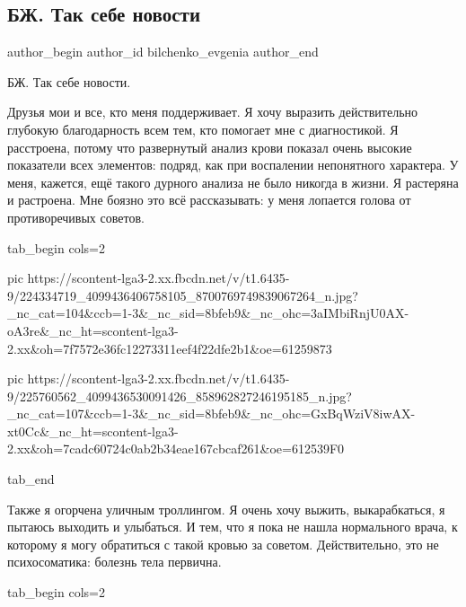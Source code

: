  
 
 
 
 
 
\subsection{БЖ. Так себе новости}
\label{sec:27_07_2021.fb.bilchenko_evgenia.5.bolezn}
\ifcmt
 author_begin
   author_id bilchenko_evgenia
 author_end
\fi

БЖ. Так себе новости.

Друзья мои и все, кто меня поддерживает. Я хочу выразить действительно глубокую
благодарность всем тем, кто помогает мне с диагностикой. Я расстроена, потому
что развернутый анализ крови показал очень высокие показатели всех элементов:
подряд, как при воспалении непонятного характера. У меня, кажется, ещё такого
дурного анализа не было никогда в жизни. Я растеряна и растроена. Мне боязно
это всё рассказывать: у меня лопается голова от противоречивых советов.

\ifcmt
  tab_begin cols=2

     pic https://scontent-lga3-2.xx.fbcdn.net/v/t1.6435-9/224334719_4099436406758105_8700769749839067264_n.jpg?_nc_cat=104&ccb=1-3&_nc_sid=8bfeb9&_nc_ohc=3aIMbiRnjU0AX-oA3re&_nc_ht=scontent-lga3-2.xx&oh=7f7572e36fc12273311eef4f22dfe2b1&oe=61259873

     pic https://scontent-lga3-2.xx.fbcdn.net/v/t1.6435-9/225760562_4099436530091426_858962827246195185_n.jpg?_nc_cat=107&ccb=1-3&_nc_sid=8bfeb9&_nc_ohc=GxBqWziV8iwAX-xt0Cc&_nc_ht=scontent-lga3-2.xx&oh=7cadc60724c0ab2b34eae167cbcaf261&oe=612539F0

  tab_end
\fi

Также я огорчена уличным троллингом. Я очень хочу выжить, выкарабкаться, я
пытаюсь выходить и улыбаться. И тем, что я пока не нашла нормального врача, к
которому я могу обратиться с такой кровью за советом. Действительно, это не
психосоматика: болезнь тела первична. 

\ifcmt
  tab_begin cols=2

